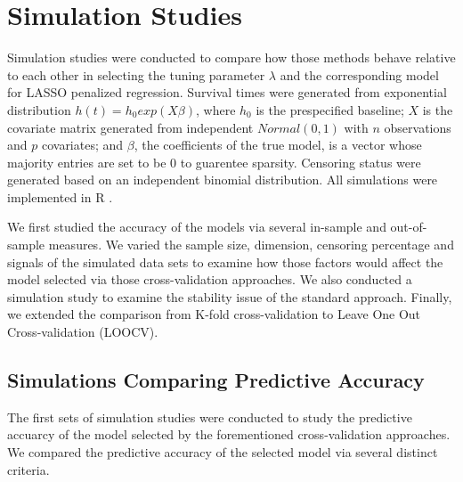 \section{Simulation Studies}

Simulation studies were conducted to compare how those methods behave relative to each other in selecting the tuning parameter $\lambda$ and the corresponding model for LASSO penalized regression. Survival times were generated from exponential distribution $h(t) = h_{0} exp(X\beta)$, where $h_{0}$ is the prespecified baseline; $X$ is the covariate matrix generated from independent $Normal(0, 1)$ with $n$ observations and $p$ covariates; and $\beta$, the coefficients of the true model, is a vector whose majority entries are set to be 0 to guarentee sparsity. Censoring status were generated based on an independent binomial distribution. All simulations were implemented in R \citep{R}.

We first studied the accuracy of the models via several in-sample and out-of-sample measures. We varied the sample size, dimension, censoring percentage and signals of the simulated data sets to examine how those factors would affect the model selected via those cross-validation approaches. We also conducted a simulation study to examine the stability issue of the standard approach. Finally, we extended the comparison from K-fold cross-validation to Leave One Out Cross-validation (LOOCV).
   
    \subsection {Simulations Comparing Predictive Accuracy}
\par The first sets of simulation studies were conducted to study the predictive accuarcy of the model selected by the forementioned cross-validation approaches. We compared the predictive accuracy of the selected model via several distinct criteria.

